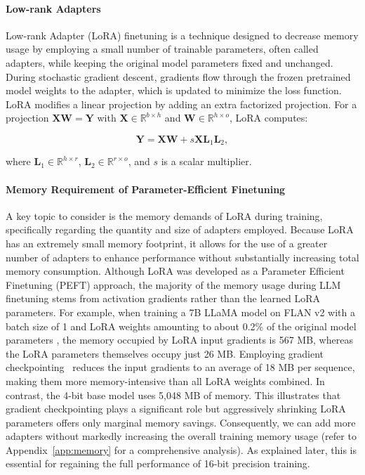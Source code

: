 \paragraph{Low-rank Adapters} Low-rank Adapter (LoRA) finetuning \citep{hu2021lora} is a technique designed to decrease memory usage by employing a small number of trainable parameters, often called adapters, while keeping the original model parameters fixed and unchanged. During stochastic gradient descent, gradients flow through the frozen pretrained model weights to the adapter, which is updated to minimize the loss function. LoRA modifies a linear projection by adding an extra factorized projection. For a projection ${\mathbf{X} \mathbf{W} = \mathbf{Y}}$ with $\mathbf{X}\in  \mathbb{R}^{b\times h}$ and $\mathbf{W}\in  \mathbb{R}^{h\times o}$, LoRA computes:

\begin{equation}
    \mathbf{Y} = \mathbf{X}\mathbf{W} + s\mathbf{X}\mathbf{L}_1\mathbf{L}_2,
\end{equation}

where $\mathbf{L}_1\in  \mathbb{R}^{h\times r}$, $\mathbf{L}_2\in  \mathbb{R}^{r\times o}$, and $s$ is a scalar multiplier.

\paragraph{Memory Requirement of Parameter-Efficient Finetuning} A key topic to consider is the memory demands of LoRA during training, specifically regarding the quantity and size of adapters employed. Because LoRA has an extremely small memory footprint, it allows for the use of a greater number of adapters to enhance performance without substantially increasing total memory consumption. Although LoRA was developed as a Parameter Efficient Finetuning (PEFT) approach, the majority of the memory usage during LLM finetuning stems from activation gradients rather than the learned LoRA parameters. For example, when training a 7B LLaMA model on FLAN v2 with a batch size of 1 and LoRA weights amounting to about 0.2\% of the original model parameters \citep{hu2021lora,liu2022few}, the memory occupied by LoRA input gradients is 567 MB, whereas the LoRA parameters themselves occupy just 26 MB. Employing gradient checkpointing~\citep{chen2016training} reduces the input gradients to an average of 18 MB per sequence, making them more memory-intensive than all LoRA weights combined. In contrast, the 4-bit base model uses 5,048 MB of memory. This illustrates that gradient checkpointing plays a significant role but aggressively shrinking LoRA parameters offers only marginal memory savings. Consequently, we can add more adapters without markedly increasing the overall training memory usage (refer to Appendix~\ref{app:memory} for a comprehensive analysis). As explained later, this is essential for regaining the full performance of 16-bit precision training.

